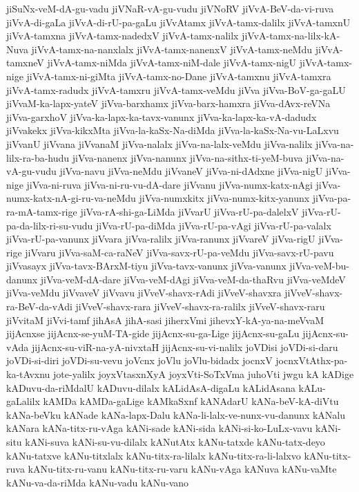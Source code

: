 {jiSuNx-veM-dA-gu-vadu
jiVNaR-vA-gu-vudu
jiVNoRV
jiVvA-BeV-da-vi-ruva
jiVvA-di-gaLa
jiVvA-di-rU-pa-gaLu
jiVvAtamx
jiVvA-tamx-dalilx
jiVvA-tamxnU
jiVvA-tamxna
jiVvA-tamx-nadedxV
jiVvA-tamx-nalilx
jiVvA-tamx-na-lilx-kA-Nuva
jiVvA-tamx-na-nanxlalx
jiVvA-tamx-nanenxV
jiVvA-tamx-neMdu
jiVvA-tamxneV
jiVvA-tamx-niMda
jiVvA-tamx-niM-dale
jiVvA-tamx-nigU
jiVvA-tamx-nige
jiVvA-tamx-ni-giMta
jiVvA-tamx-no-Dane
jiVvA-tamxnu
jiVvA-tamxra
jiVvA-tamx-radudx
jiVvA-tamxru
jiVvA-tamx-veMdu
jiVva
jiVva-BoV-ga-gaLU
jiVvaM-ka-lapx-yateV
jiVva-barxhamx
jiVva-barx-hamxra
jiVva-dAvx-reVNa
jiVva-garxhoV
jiVva-ka-lapx-ka-tavx-vanunx
jiVva-ka-lapx-ka-vA-dadudx
jiVvakekx
jiVva-kikxMta
jiVva-la-kaSx-Na-diMda
jiVva-la-kaSx-Na-vu-LaLxvu
jiVvanU
jiVvana
jiVvanaM
jiVva-nalalx
jiVva-na-lalx-veMdu
jiVva-nalilx
jiVva-na-lilx-ra-ba-hudu
jiVva-nanenx
jiVva-nanunx
jiVva-na-sithx-ti-yeM-buva
jiVva-na-vA-gu-vudu
jiVva-navu
jiVva-neMdu
jiVvaneV
jiVva-ni-dAdxne
jiVva-nigU
jiVva-nige
jiVva-ni-ruva
jiVva-ni-ru-vu-dA-dare
jiVvanu
jiVva-numx-katx-nAgi
jiVva-numx-katx-nA-gi-ru-va-neMdu
jiVva-numxkitx
jiVva-numx-kitx-yanunx
jiVva-pa-ra-mA-tamx-rige
jiVva-rA-shi-ga-LiMda
jiVvarU
jiVva-rU-pa-dalelxV
jiVva-rU-pa-da-lilx-ri-su-vudu
jiVva-rU-pa-diMda
jiVva-rU-pa-vAgi
jiVva-rU-pa-valalx
jiVva-rU-pa-vanunx
jiVvara
jiVva-ralilx
jiVva-ranunx
jiVvareV
jiVva-rigU
jiVva-rige
jiVvaru
jiVva-saM-ca-raNeV
jiVva-savx-rU-pa-veMdu
jiVva-savx-rU-pavu
jiVvasayx
jiVva-tavx-BArxM-tiyu
jiVva-tavx-vanunx
jiVva-vanunx
jiVva-veM-bu-danunx
jiVva-veM-dA-dare
jiVva-veM-dAgi
jiVva-veM-da-thaRvu
jiVva-veMdeV
jiVva-veMdu
jiVvaveV
jiVvavu
jiVveV-shavx-rAdi
jiVveV-shavxra
jiVveV-shavx-ra-BeV-da-vAdi
jiVveV-shavx-rara
jiVveV-shavx-ra-ralilx
jiVveV-shavx-raru
jiVvitaM
jiVvi-tamf
jihAsA
jihA-sasi
jiherxVmi
jihevxY-kA-ya-na-meVvaM
jijAcnxse
jijAcnx-se-yuM-TA-gide
jijAcnx-su-ga-Lige
jijAcnx-su-gaLu
jijAcnx-su-vAda
jijAcnx-su-viR-na-yA-nivxtaH
jijAcnx-su-vi-nalilx
joVDisi
joVDi-si-daru
joVDi-si-diri
joVDi-su-vevu
joVcnx
joVlu
joVlu-bidadx
jocnxV
jocnxVtAthx-pa-ka-tAvxnu
jote-yalilx
joyxVtasxnXyA
joyxVti-SoTxVma
juhoVti
jwgu
kA
kADige
kADuvu-da-riMdalU
kADuvu-dilalx
kALidAsA-digaLu
kALidAsana
kALu-gaLalilx
kAMDa
kAMDa-gaLige
kAMkaSxnf
kANAdarU
kANa-beV-kA-diVtu
kANa-beVku
kANade
kANa-lapx-Dalu
kANa-li-lalx-ve-nunx-vu-danunx
kANalu
kANara
kANa-titx-ru-vAga
kANi-sade
kANi-sida
kANi-si-ko-LuLx-vavu
kANi-situ
kANi-suva
kANi-su-vu-dilalx
kANutAtx
kANu-tatxde
kANu-tatx-deyo
kANu-tatxve
kANu-titxlalx
kANu-titx-ra-lilalx
kANu-titx-ra-li-lalxvo
kANu-titx-ruva
kANu-titx-ru-vanu
kANu-titx-ru-varu
kANu-vAga
kANuva
kANu-vaMte
kANu-va-da-riMda
kANu-vadu
kANu-vano
}
